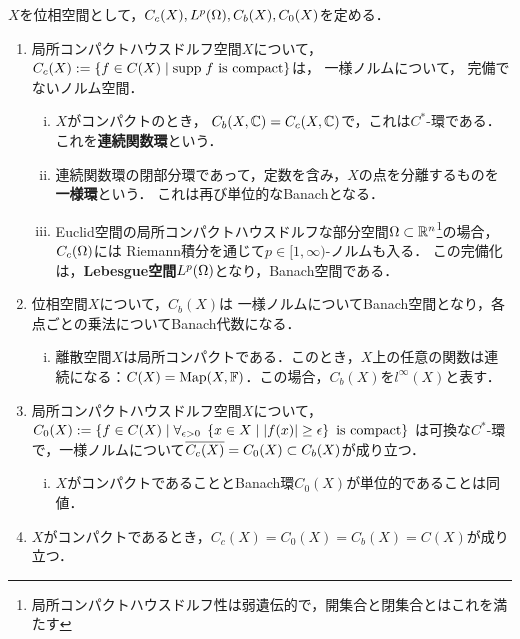\documentclass[uplatex,dvipdfmx]{jsreport}
\begin{document}
\begin{example}[位相空間上の体値関数]\label{exp-Banach-spaces}
    $X$を位相空間として，$C_c(X),L^p(\Omega),C_b(X),C_0(X)$を定める．
    \begin{enumerate}
        \item 局所コンパクトハウスドルフ空間$X$について，$C_c(X):=\left\{f\in C(X)\mid\mathrm{supp}\; f\text{ is compact}\right\}$は，
        一様ノルムについて，
        完備でないノルム空間．
        \begin{enumerate}[(i)]
            \item $X$がコンパクトのとき，
            $C_b(X,\mathbb{C})=C_c(X,\mathbb{C})$で，これは$C^*$-環である．
            これを\textbf{連続関数環}という．
            \item 連続関数環の閉部分環であって，定数を含み，$X$の点を分離するものを\textbf{一様環}という．
            これは再び単位的なBanachとなる．
            \item Euclid空間の局所コンパクトハウスドルフな部分空間$\Omega\subset\mathbb{R}^n$\footnote{局所コンパクトハウスドルフ性は弱遺伝的で，開集合と閉集合とはこれを満たす}の場合，$C_c(\Omega)$には
            Riemann積分を通じて$p\in[1,\infty)$-ノルムも入る．
            この完備化は，\textbf{Lebesgue空間}$L^p(\Omega)$となり，Banach空間である．
        \end{enumerate}
        \item 位相空間$X$について，$C_b(X)$は
        一様ノルムについてBanach空間となり，各点ごとの乗法についてBanach代数になる．
        \begin{enumerate}[(i)]
            \item 離散空間$X$は局所コンパクトである．このとき，$X$上の任意の関数は連続になる：$C(X)=\mathrm{Map}(X,\mathbb{F})$．この場合，$C_b(X)$を$l^\infty(X)$と表す．
        \end{enumerate}
        \item 局所コンパクトハウスドルフ空間$X$について，
        $C_0(X):=\left\{f\in C(X)\mid\forall_{\epsilon>0}\;\left\{x\in X\mid\lvert f(x)\rvert\ge\epsilon\right\}\text{ is compact}\right\}$
        は可換な$C^*$-環で，一様ノルムについて$\overline{C_c(X)}=C_0(X)\subset C_b(X)$が成り立つ．
        \begin{enumerate}[(i)]
            \item $X$がコンパクトであることとBanach環$C_0(X)$が単位的であることは同値．
        \end{enumerate}
        \item $X$がコンパクトであるとき，$C_c(X)=C_0(X)=C_b(X)=C(X)$が成り立つ．
    \end{enumerate}
\end{example}
\end{document}
